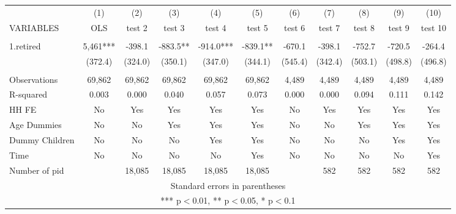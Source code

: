 \begin{tabular}{lcccccccccc} \hline
 & (1) & (2) & (3) & (4) & (5) & (6) & (7) & (8) & (9) & (10) \\
VARIABLES & OLS & test 2 & test 3 & test 4 & test 5 & test 6 & test 7 & test 8 & test 9 & test 10 \\ \hline
 &  &  &  &  &  &  &  &  &  &  \\
1.retired & 5,461*** & -398.1 & -883.5** & -914.0*** & -839.1** & -670.1 & -398.1 & -752.7 & -720.5 & -264.4 \\
 & (372.4) & (324.0) & (350.1) & (347.0) & (344.1) & (545.4) & (342.4) & (503.1) & (498.8) & (496.8) \\
 &  &  &  &  &  &  &  &  &  &  \\
Observations & 69,862 & 69,862 & 69,862 & 69,862 & 69,862 & 4,489 & 4,489 & 4,489 & 4,489 & 4,489 \\
R-squared & 0.003 & 0.000 & 0.040 & 0.057 & 0.073 & 0.000 & 0.000 & 0.094 & 0.111 & 0.142 \\
HH FE & No & Yes & Yes & Yes & Yes & No & Yes & Yes & Yes & Yes \\
Age Dummies & No & No & Yes & Yes & Yes & No & No & Yes & Yes & Yes \\
Dummy Children & No & No & No & Yes & Yes & No & No & No & Yes & Yes \\
Time & No & No & No & No & Yes & No & No & No & No & Yes \\
 Number of pid &  & 18,085 & 18,085 & 18,085 & 18,085 &  & 582 & 582 & 582 & 582 \\ \hline
\multicolumn{11}{c}{ Standard errors in parentheses} \\
\multicolumn{11}{c}{ *** p$<$0.01, ** p$<$0.05, * p$<$0.1} \\
\end{tabular}
